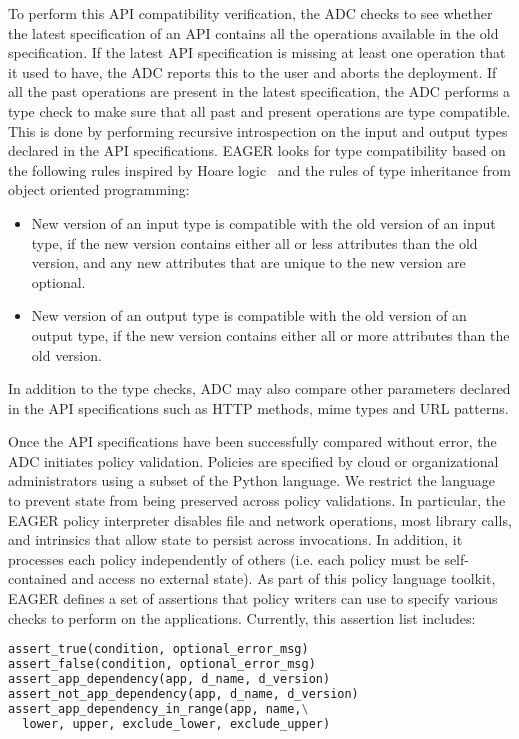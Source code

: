 To perform this API compatibility verification, the ADC checks to see whether
the latest specification of an API contains all the operations available in
the old specification. If the latest API specification is missing at least one
operation that it used to have, the ADC reports this to the user and aborts
the deployment. If all the past operations are present in the latest
specification, the ADC performs a type check to make sure that all past and
present operations are type compatible. This is done by performing recursive
introspection on the input and output types declared in the API
specifications. EAGER looks for type compatibility based on the following
rules inspired by Hoare logic~\cite{Hoare:1969:ABC:363235.363259} and the
rules of type inheritance from object oriented programming:
\begin{itemize}
\item New version of an input type is compatible with the old version of an input type, if the new version contains either all or less attributes than the 
old version, and any new attributes that are unique to the new version are optional.
\item New version of an output type is compatible with the old version of an output type, if the new version contains either all or more attributes than the 
old version.
\end{itemize}
In addition to the type checks, ADC may also compare other parameters declared in the API specifications
such as HTTP methods, mime types and URL patterns.

Once the API specifications have been successfully compared without error,
the ADC initiates policy validation. Policies are specified by cloud
or organizational administrators using a subset of the Python language.  
We restrict the language to prevent state from being preserved across
policy validations. In particular, the EAGER policy interpreter disables file
and network operations, most library calls, and intrinsics that allow
state to persist across invocations.  In addition, it processes each 
policy independently of others (i.e. each policy must be self-contained and 
access no external state).  As part of this policy language toolkit, EAGER
defines a set of assertions that policy writers can use to specify various 
checks to perform on the applications. 
Currently, this assertion list includes:

{\footnotesize 
\begin{lstlisting}[language=Python, frame=single]
assert_true(condition, optional_error_msg)
assert_false(condition, optional_error_msg)
assert_app_dependency(app, d_name, d_version)
assert_not_app_dependency(app, d_name, d_version)
assert_app_dependency_in_range(app, name,\
  lower, upper, exclude_lower, exclude_upper)
\end{lstlisting}
}

